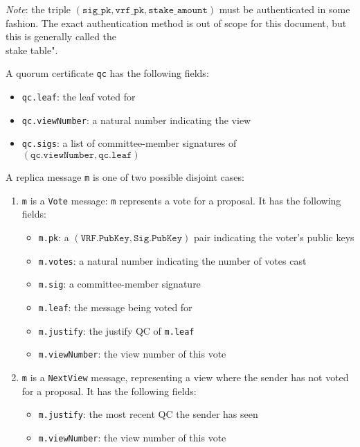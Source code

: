\documentclass[11pt, oneside]{article}       %
\begin{document}
\emph{Note}: the triple \((\texttt{sig\_pk}, \texttt{vrf\_pk},
\texttt{stake\_amount})\) must be authenticated in some fashion. The exact
authentication method is out of scope for this document, but this is
generally called the \\stake table".

A quorum certificate \texttt{qc} has the following fields:

\begin{itemize}
    \item \texttt{qc.leaf}: the leaf voted for
    \item \texttt{qc.viewNumber}: a natural number indicating the view 
    \item \texttt{qc.sigs}: a list of committee-member signatures of
        \((\texttt{qc.viewNumber},\texttt{qc.leaf})\)
\end{itemize}

A replica message \texttt{m} is one of two possible disjoint cases:

\begin{enumerate}
    \item \texttt{m} is a \texttt{Vote} message: \texttt{m} represents a
        vote for a proposal. It has the following fields:

        \begin{itemize}
            \item \texttt{m.pk}: a \((\texttt{VRF.PubKey},
                \texttt{Sig.PubKey})\) pair indicating the voter's public
                keys
            \item \texttt{m.votes}: a natural number indicating the number
                of votes cast
            \item \texttt{m.sig}: a committee-member signature
            \item \texttt{m.leaf}: the message being voted for
            \item \texttt{m.justify}: the justify QC of \texttt{m.leaf}
            \item \texttt{m.viewNumber}: the view number of this vote
        \end{itemize}

    \item \texttt{m} is a \texttt{NextView} message, representing a view
        where the sender has not voted for a proposal. It has the following
        fields:

        \begin{itemize}
            \item \texttt{m.justify}: the most recent QC the sender has
                seen
            \item \texttt{m.viewNumber}: the view number of this vote
        \end{itemize}
\end{enumerate}
\end{document}
